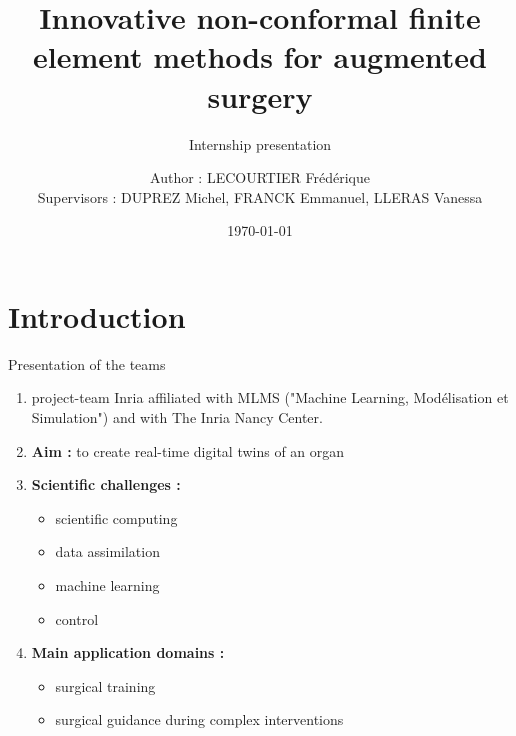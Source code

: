 \documentclass[compress,10pt,xcolor={table,dvipsnames},t]{beamer}
\title[PhiFEM]{Innovative non-conformal finite element methods for augmented surgery}
\subtitle{Internship presentation}
\author[name]{Author : LECOURTIER Frédérique \\ Supervisors : DUPREZ Michel, FRANCK Emmanuel, LLERAS Vanessa}
\institute{\large Strasbourg University}
\date{\today}
\begin{document}
	\nocite{*}
	
	\begin{frame}
		\vspace{-20pt}
		\titlepage
	\end{frame}
	
	\AtBeginSection[]{
		\begin{frame}
			\vfill
			\centering
			\begin{beamercolorbox}[sep=5pt,shadow=true,rounded=true]{subtitle}
				\usebeamerfont{title}\insertsectionhead\par%
			\end{beamercolorbox}
			\tableofcontents[sectionstyle=hide,subsectionstyle=show/shaded/hide]
			\vfill
		\end{frame}
	}


	\section{Introduction}

	\begin{frame}{Presentation of the teams}
		\begin{center}
		\end{center}
		\begin{enumerate}[\ding{217}]
			\item project-team Inria affiliated with MLMS ("Machine Learning, Modélisation et Simulation") and with The Inria Nancy Center.
			\item \textbf{Aim :} to create real-time digital twins of an organ
			\item \textbf{Scientific challenges :}
			\begin{itemize}
				\item scientific computing
				\item data assimilation
				\item machine learning
				\item control
			\end{itemize}
			\item \textbf{Main application domains :}
			\begin{itemize}
				\item surgical training
				\item surgical guidance during complex interventions
			\end{itemize}
		\end{enumerate}
	\end{frame}
\end{document}
